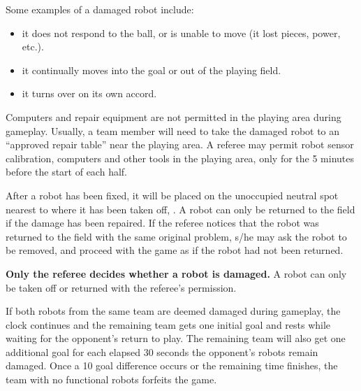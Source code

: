 \documentclass{article}
\begin{document}
Some examples of a damaged robot include:

\begin{itemize}

\item it does not respond to the ball, or is unable to move (it lost pieces,
    power, etc.).

\item it continually moves into the goal or out of the playing field.

\item it turns over on its own accord.

\end{itemize}

Computers and repair equipment are not permitted in the playing area during
gameplay. Usually, a team member will need to take the damaged robot to an
``approved repair table'' near the playing area. A referee may permit robot sensor
calibration, computers and other tools in the playing area, only for the 5
minutes before the start of each half. 

After a robot has been fixed, it will be placed on the unoccupied neutral spot
nearest to where it has been taken off, .
A robot can only be returned to the field if the damage has been
repaired. If the referee notices that the robot was returned to the field with
the same original problem, s/he may ask the robot to be removed, and proceed
with the game as if the robot had not been returned.

\textbf{Only the referee decides whether a robot is damaged.} A robot can only
be taken off or returned with the referee's permission.

{
If both robots from the same team are deemed damaged during gameplay, the clock
continues and the remaining team gets one initial goal and rests while waiting
for the opponent's return to play. The remaining team will also get one
additional goal for each elapsed 30 seconds the opponent's robots remain
damaged. Once a 10 goal difference occurs or the remaining time finishes, the
team with no functional robots forfeits the game.
}
\end{document}
